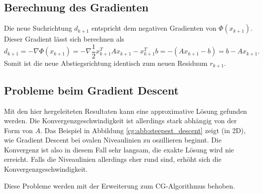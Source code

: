 \subsection{Berechnung des Gradienten}
Die neue Suchrichtung $d_{k+1}$ entspricht dem negativen Gradienten von $\Phi(x_{k+1})$.
Dieser Gradient lässt sich berechnen als
\begin{equation}
	d_{k+1} = - \nabla \Phi(x_{k+1}) = - \nabla \frac{1}{2} x_{k+1}^T A x_{k+1} - x_{k+1}^T b = -(Ax_{k+1} - b) = b - Ax_{k+1}.
\end{equation}
Somit ist die neue Abstiegsrichtung identisch zum neuen Residuum $r_{k+1}$.

\subsection{Probleme beim Gradient Descent}
Mit den hier hergeleiteten Resultaten kann eine approximative Lösung gefunden werden.
Die Konvergenzgeschwindigkeit ist allerdings stark abhängig von der Form von $A$.
Das Beispiel in Abbildung \ref{cg:abb:steepest_descent} zeigt (in 2D), wie Gradient Descent bei ovalen Niveaulinien zu oszillieren beginnt.
Die Konvergenz ist also in diesem Fall sehr langsam, die exakte Lösung wird nie erreicht.
Falls die Niveaulinien allerdings eher rund sind, erhöht sich die Konvergenzgeschwindigkeit.

Diese Probleme werden mit der Erweiterung zum CG-Algorithmus behoben.

